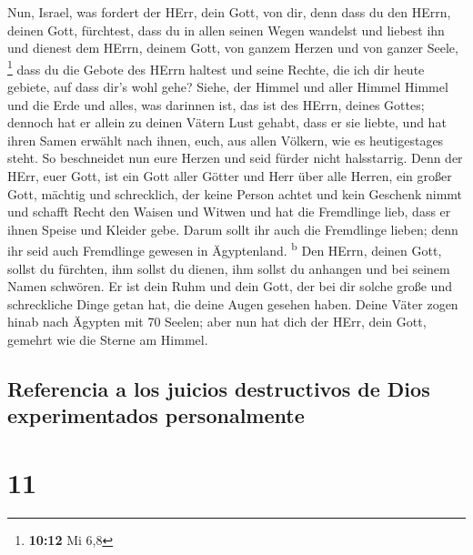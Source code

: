  Nun, Israel, was fordert der HErr, dein Gott, von dir,
denn dass du den HErrn, deinen Gott, fürchtest, dass du in allen seinen
Wegen wandelst und liebest ihn und dienest dem HErrn, deinem Gott, von
ganzem Herzen und von ganzer Seele, \footnote{\textbf{10:12} Mi 6,8}
 dass du die Gebote des HErrn haltest und seine Rechte,
die ich dir heute gebiete, auf dass dir's wohl gehe? 
Siehe, der Himmel und aller Himmel Himmel und die Erde und alles, was
darinnen ist, das ist des HErrn, deines Gottes;  dennoch
hat er allein zu deinen Vätern Lust gehabt, dass er sie liebte, und hat
ihren Samen erwählt nach ihnen, euch, aus allen Völkern, wie es
heutigestages steht.  So beschneidet nun eure Herzen und
seid fürder nicht halsstarrig.  Denn der HErr, euer Gott,
ist ein Gott aller Götter und Herr über alle Herren, ein großer Gott,
mächtig und schrecklich, der keine Person achtet und kein Geschenk nimmt
 und schafft Recht den Waisen und Witwen und hat die
Fremdlinge lieb, dass er ihnen Speise und Kleider gebe. 
Darum sollt ihr auch die Fremdlinge lieben; denn ihr seid auch
Fremdlinge gewesen in Ägyptenland. \textsuperscript{b} 
Den HErrn, deinen Gott, sollst du fürchten, ihm sollst du dienen, ihm
sollst du anhangen und bei seinem Namen schwören.  Er ist
dein Ruhm und dein Gott, der bei dir solche große und schreckliche Dinge
getan hat, die deine Augen gesehen haben.  Deine Väter
zogen hinab nach Ägypten mit 70 Seelen; aber nun hat dich der HErr, dein
Gott, gemehrt wie die Sterne am Himmel.

\hypertarget{referencia-a-los-juicios-destructivos-de-dios-experimentados-personalmente}{%
\subsection{Referencia a los juicios destructivos de Dios experimentados
personalmente}\label{referencia-a-los-juicios-destructivos-de-dios-experimentados-personalmente}}

\hypertarget{section-10}{%
\section{11}\label{section-10}}


